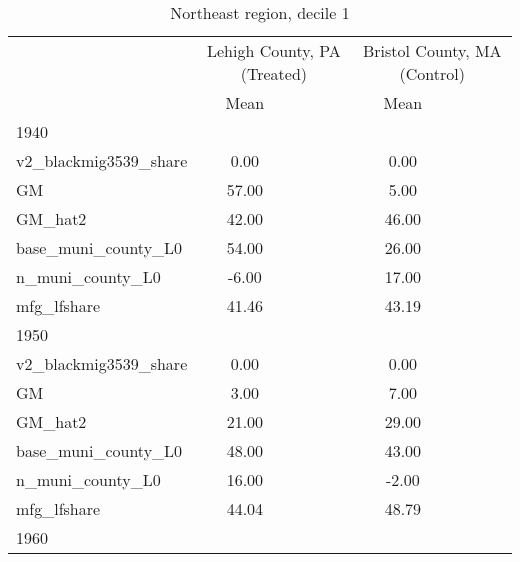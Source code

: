 \begin{table}[htbp]\centering
\def\sym#1{\ifmmode^{#1}\else\(^{#1}\)\fi}
\caption{Northeast region, decile 1 \label{tab1}}
\begin{tabular}{l*{2}{ccc}}
\toprule
                    &\multicolumn{3}{c}{Lehigh County, PA (Treated)}&\multicolumn{3}{c}{Bristol County, MA (Control)}\\
                    &        Mean&            &            &        Mean&            &            \\
\midrule
1940                &            &            &            &            &            &            \\
v2\_blackmig3539\_share&        0.00&            &            &        0.00&            &            \\
GM                  &       57.00&            &            &        5.00&            &            \\
GM\_hat2             &       42.00&            &            &       46.00&            &            \\
base\_muni\_county\_L0 &       54.00&            &            &       26.00&            &            \\
n\_muni\_county\_L0    &       -6.00&            &            &       17.00&            &            \\
mfg\_lfshare         &       41.46&            &            &       43.19&            &            \\
\midrule
1950                &            &            &            &            &            &            \\
v2\_blackmig3539\_share&        0.00&            &            &        0.00&            &            \\
GM                  &        3.00&            &            &        7.00&            &            \\
GM\_hat2             &       21.00&            &            &       29.00&            &            \\
base\_muni\_county\_L0 &       48.00&            &            &       43.00&            &            \\
n\_muni\_county\_L0    &       16.00&            &            &       -2.00&            &            \\
mfg\_lfshare         &       44.04&            &            &       48.79&            &            \\
\midrule
1960                &            &            &            &            &            &            \\

\end{tabular}
\end{table}

